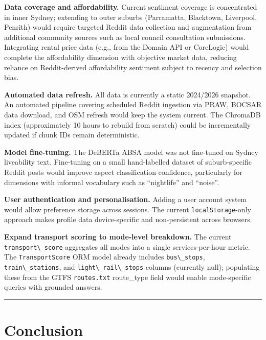 \documentclass[11pt,a4paper]{article}
\newcommand{\passthrough}[1]{#1}
\begin{document}
\textbf{Data coverage and affordability.} Current sentiment coverage is concentrated in inner Sydney; extending to outer suburbs (Parramatta, Blacktown, Liverpool, Penrith) would require targeted Reddit data collection and augmentation from additional community sources such as local council consultation submissions. Integrating rental price data (e.g., from the Domain API or CoreLogic) would complete the affordability dimension with objective market data, reducing reliance on Reddit-derived affordability sentiment subject to recency and selection bias.

\textbf{Automated data refresh.} All data is currently a static 2024/2026 snapshot. An automated pipeline covering scheduled Reddit ingestion via PRAW, BOCSAR data download, and OSM refresh would keep the system current. The ChromaDB index (approximately 10 hours to rebuild from scratch) could be incrementally updated if chunk IDs remain deterministic.

\textbf{Model fine-tuning.} The DeBERTa ABSA model was not fine-tuned on Sydney liveability text. Fine-tuning on a small hand-labelled dataset of suburb-specific Reddit posts would improve aspect classification confidence, particularly for dimensions with informal vocabulary such as ``nightlife'' and ``noise''.

\textbf{User authentication and personalisation.} Adding a user account system would allow preference storage across sessions. The current \passthrough{\lstinline!localStorage!}-only approach makes profile data device-specific and non-persistent across browsers.

\textbf{Expand transport scoring to mode-level breakdown.} The current \passthrough{\lstinline!transport\_score!} aggregates all modes into a single services-per-hour metric. The \passthrough{\lstinline!TransportScore!} ORM model already includes \passthrough{\lstinline!bus\_stops!}, \passthrough{\lstinline!train\_stations!}, and \passthrough{\lstinline!light\_rail\_stops!} columns (currently null); populating these from the GTFS \passthrough{\lstinline!routes.txt!} route\_type field would enable mode-specific queries with grounded answers.

\begin{center}\rule{0.5\linewidth}{0.5pt}\end{center}

\section{Conclusion}\label{9-conclusion}
\end{document}
